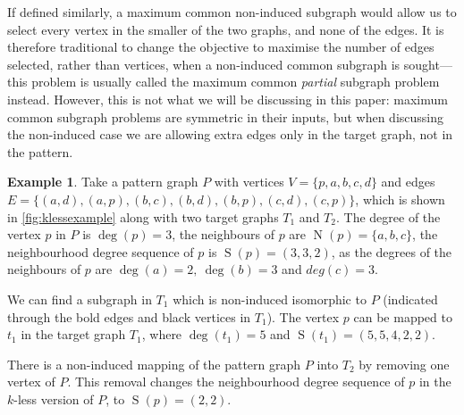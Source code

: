 \documentclass[letterpaper]{article}
\theoremstyle{definition}
\newtheorem{example}{Example}
\newcommand{\N}{\operatorname{N}}
\newcommand{\nds}{\operatorname{S}}
\begin{document}
If defined similarly, a maximum common non-induced subgraph would allow us to select every vertex in
the smaller of the two graphs, and none of the edges. It is therefore traditional to change the
objective to maximise the number of edges selected, rather than vertices, when a non-induced common
subgraph is sought---this problem is usually called the maximum common \emph{partial} subgraph
problem instead. However, this is not what we will be discussing in this paper: maximum common
subgraph problems are symmetric in their inputs, but when discussing the non-induced case we are
allowing extra edges only in the target graph, not in the pattern.

\begin{example}
Take a pattern graph $P$ with vertices $V=\{p, a, b, c, d\}$ and edges $E=\{(a,d), (a,p), (b,c),
(b,d), (b,p), (c,d), (c,p)\}$, which is shown in \cref{fig:klessexample} along with two target
graphs $T_{1}$ and $T_{2}$. The degree of the vertex $p$ in $P$ is $\deg(p)=3$, the neighbours of
$p$ are $\N(p)=\{a,b,c\}$, the neighbourhood degree sequence of $p$ is $\nds(p)=(3,3,2)$, as the
degrees of the neighbours of $p$ are $\deg(a)=2,\ \deg(b)=3$ and $deg(c)=3$.

We can find a subgraph in $T_{1}$ which is non-induced isomorphic to $P$ (indicated through the bold edges and black vertices in $T_{1}$). The vertex $p$ can be  mapped to $t_{1}$ in the target graph $T_{1}$, where $\deg(t_{1})=5$ and $\nds(t_{1})=(5,5,4,2,2)$.

There is a non-induced mapping of the pattern graph $P$ into $T_{2}$ by removing one vertex of $P$. This removal changes the neighbourhood degree sequence of $p$ in the $k$-less version of $P$, to $\nds(p)=(2,2)$.

\begin{figure}
    \centering
\end{figure}
\end{example}
\end{document}
